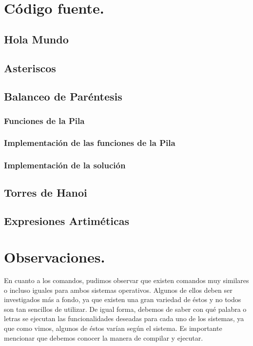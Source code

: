\documentclass[12pt]{article}
\begin{document}
\section{Código fuente.}
        \subsection{Hola Mundo} 
            
        \subsection{Asteriscos}
            
        \subsection{Balanceo de Paréntesis} 
                \subsubsection{Funciones de la Pila}
                    
                \subsubsection{Implementación de las funciones de la Pila}
                    
                \subsubsection{Implementación de la solución}
                    
        \subsection{Torres de Hanoi}
            
        \subsection{Expresiones Artiméticas}
            
\section{Observaciones.}

En cuanto a los comandos, pudimos observar que existen comandos muy similares o incluso iguales para ambos sistemas operativos. Algunos de ellos deben ser investigados más a fondo, ya que existen una gran variedad de éstos y no todos son tan sencillos de utilizar. De igual forma, debemos de saber con qué palabra o letras se ejecutan las funcionalidades deseadas para cada uno de los sistemas, ya que como vimos, algunos de éstos varían según el sistema. Es importante mencionar que debemos conocer la manera de compilar y ejecutar.
\end{document}
